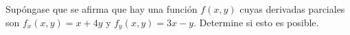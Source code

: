 \item Supóngase que se afirma que hay una función $f(x, y)$ cuyas derivadas parciales son $f_x(x, y) = x + 4y$ y $f_y(x, y) = 3x - y$. Determine si esto es posible.
